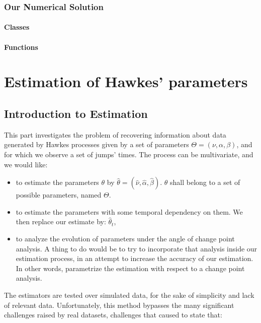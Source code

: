 \documentclass[11pt]{book}
\begin{document}
\section{Our Numerical Solution}

\subsection{Classes}
\subsection{Functions}












\part{Estimation of Hawkes' parameters}
\chapter{Introduction to Estimation}

This part investigates the problem of recovering information about data generated by Hawkes processes given by a set of parameters $\Theta = ( \nu, \alpha, \beta ) $, and for which we observe a set of jumps' times. The process can be multivariate, and we would like:

\begin{itemize}
\item to estimate the parameters $\theta$ by $\hat{\theta} = ( \hat{\nu}, \hat{\alpha}, \hat{\beta} )$. $\theta$ shall belong to a set of possible parameters, named $\Theta$.

\item to estimate the parameters with some temporal dependency on them. We then replace our estimate by: $\hat{\theta}_t$,
\item to analyze the evolution of parameters under the angle of change point analysis. A thing to do would be to try to incorporate that analysis inside our estimation process, in an attempt to increase the accuracy of our estimation. In other words, parametrize the estimation with respect to a change point analysis.
\end{itemize}


The estimators are tested over simulated data, for the sake of simplicity and lack of relevant data. Unfortunately, this method bypasses the many significant challenges raised by real datasets, challenges that caused \cite{critic_hawkes} to state that:
\end{document}
